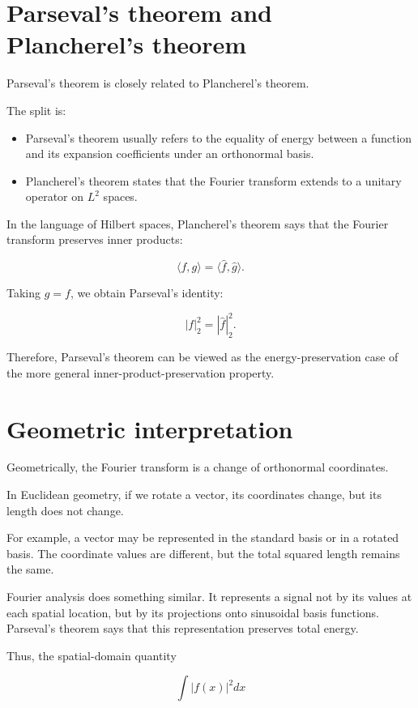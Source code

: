 \section{Parseval’s theorem and Plancherel’s theorem}

Parseval’s theorem is closely related to Plancherel’s theorem.

The split is:

\begin{itemize}
  \item Parseval’s theorem usually refers to the equality of energy between a function and its expansion coefficients under an orthonormal basis.
  \item Plancherel’s theorem states that the Fourier transform extends to a unitary operator on \(L^2\) spaces.
\end{itemize}

In the language of Hilbert spaces, Plancherel’s theorem says that the Fourier transform preserves inner products:

\[
\langle f,g\rangle
=
\langle \widehat{f},\widehat{g}\rangle.
\]

Taking \(g=f\), we obtain Parseval’s identity:

\[
|f|_2^2
=
|\widehat{f}|_2^2.
\]

Therefore, Parseval’s theorem can be viewed as the energy-preservation case of the more general inner-product-preservation property.

\section{Geometric interpretation}

Geometrically, the Fourier transform is a change of orthonormal coordinates.

In Euclidean geometry, if we rotate a vector, its coordinates change, but its length does not change.

For example, a vector may be represented in the standard basis or in a rotated basis. The coordinate values are different, but the total squared length remains the same.

Fourier analysis does something similar. It represents a signal not by its values at each spatial location, but by its projections onto sinusoidal basis functions. Parseval’s theorem says that this representation preserves total energy.

Thus, the spatial-domain quantity

\[
\int |f(x)|^2dx
\]


